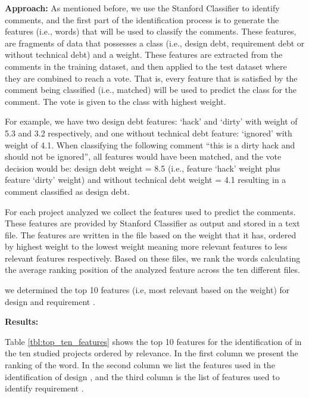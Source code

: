 \vspace{1mm}
\noindent \textbf{Approach:} As mentioned before, we use the Stanford Classifier to identify \SATD comments, and the first part of the identification process is to generate the features (i.e., words) that will be used to classify the comments. These features, are fragments of data that possesses a class (i.e., design debt, requirement debt or without technical debt) and a weight. These features are extracted from the comments in the training dataset, and then applied to the test dataset where they are combined to reach a vote. That is, every feature that is satisfied by the comment being classified (i.e., matched) will be used to predict the class for the comment. The vote is given to the class with highest weight. 

For example, we have two design debt features: `hack' and `dirty' with weight of 5.3 and 3.2 respectively, and one without technical debt feature: `ignored' with weight of 4.1. When classifying the following comment ``this is a dirty hack and should not be ignored'', all features would have been matched, and the vote decision would be: design debt weight = 8.5 (i.e., feature `hack' weight plus feature `dirty' weight) and without technical debt weight = 4.1 resulting in a comment classified as design debt.

For each project analyzed we collect the features used to predict the \SATD comments. These features are provided by Stanford Classifier as output and stored in a text file. The features are written in the file based on the weight that it has, ordered by highest weight to the lowest weight meaning more relevant features to less relevant features respectively. Based on these files, we rank the words calculating the average ranking position of the analyzed feature across the ten different files. 

we determined the top 10 features (i.e, most relevant based on the weight) for design \SATD and requirement \SATD.

\vspace{1mm}
\noindent \textbf{Results:} 

Table \ref{tbl:top_ten_features} shows the top 10 features for the identification of \SATD in the ten studied projects ordered by relevance. In the first column we present the ranking of the word. In the second column we list the features used in the identification of design \SATD, and the third column is the list of features used to identify requirement \SATD.

